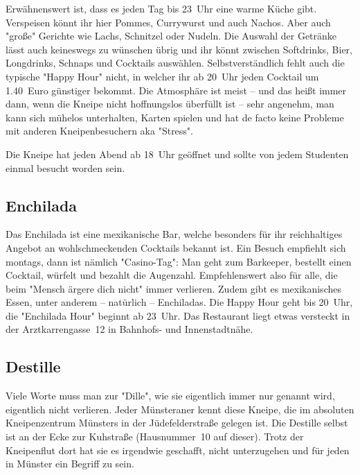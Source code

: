 {\begin{multicols*}{2}
Erwähnenswert ist, dass es jeden Tag bis 23~Uhr eine warme Küche gibt.
Verspeisen könnt ihr hier Pommes, Currywurst und auch Nachos.
Aber auch "große" Gerichte wie Lachs, Schnitzel oder Nudeln.
Die Auswahl der Getränke lässt auch keineswegs zu wünschen übrig und ihr könnt zwischen Softdrinks, Bier, Longdrinks, Schnaps und Cocktails auswählen.
Selbstverständlich fehlt auch die typische "Happy Hour" nicht, in welcher ihr ab 20~Uhr jeden Cocktail um \num{1,40}~Euro günstiger bekommt.
Die Atmosphäre ist meist -- und das heißt immer dann, wenn die Kneipe nicht hoffnungslos überfüllt ist -- sehr angenehm, man kann sich mühelos unterhalten, Karten spielen und hat de facto keine Probleme mit anderen Kneipenbesuchern aka "Stress".

Die Kneipe hat jeden Abend ab 18~Uhr geöffnet und sollte von jedem Studenten
einmal besucht worden sein.

\begin{center}
\end{center}

\subsection{Enchilada}
Das Enchilada ist eine mexikanische Bar, welche besonders für ihr reichhaltiges Angebot an wohlschmeckenden Cocktails bekannt ist.
Ein Besuch empfiehlt sich montags, dann ist nämlich "Casino-Tag":
Man geht zum Barkeeper, bestellt einen Cocktail, würfelt und bezahlt die Augenzahl.
Empfehlenswert also für alle, die beim "Mensch ärgere dich nicht" immer verlieren.
Zudem gibt es mexikanisches Essen, unter anderem -- natürlich -- Enchiladas.
Die Happy Hour geht bis 20~Uhr, die "Enchilada Hour" beginnt ab 23~Uhr.
Das Restaurant liegt etwas versteckt in der Arztkarrengasse~12 in Bahnhofs- und Innenstadtnähe.

\begin{center}
\end{center}

\subsection{Destille}
Viele Worte muss man zur "Dille", wie sie eigentlich immer nur genannt wird, eigentlich nicht verlieren.
Jeder Münsteraner kennt diese Kneipe, die im absoluten Kneipenzentrum Münsters in der Jüdefelderstraße gelegen ist.
Die Destille selbst ist an der Ecke zur Kuhstraße (Hausnummer~10 auf dieser).
Trotz der Kneipenflut dort hat sie es irgendwie geschafft, nicht unterzugehen und für jeden in Münster ein Begriff zu sein.


\end{multicols*}}
